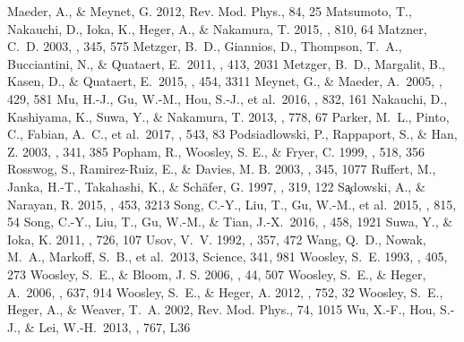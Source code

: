 \documentclass[twocolumn]{aastex6}
\begin{document}
\begin{thebibliography}{}
 Maeder, A., \& Meynet, G. 2012, Rev. Mod. Phys., 84, 25
 Matsumoto, T., Nakauchi, D., Ioka, K., Heger, A., \& Nakamura, T. 2015, \apj, 810, 64
 Matzner, C.~D. 2003, \mnras, 345, 575
 Metzger, B.~D., Giannios, D., Thompson, T.~A., Bucciantini, N., \& Quataert, E.\ 2011, \mnras, 413, 2031
 Metzger, B.~D., Margalit, B., Kasen, D., \& Quataert, E.\ 2015, \mnras, 454, 3311
 Meynet, G., \& Maeder, A.\ 2005, \aap, 429, 581
 Mu, H.-J., Gu, W.-M., Hou, S.-J., et al.\ 2016, \apj, 832, 161
 Nakauchi, D., Kashiyama, K., Suwa, Y., \& Nakamura, T. 2013, \apj, 778, 67
 Parker, M.~L., Pinto, C., Fabian, A.~C., et al.\ 2017, \nat, 543, 83
 Podsiadlowski, P., Rappaport, S., \& Han, Z. 2003, \mnras, 341, 385
 Popham, R., Woosley, S. E., \& Fryer, C. 1999, \apj, 518, 356
 Rosswog, S., Ramirez-Ruiz, E., \& Davies, M. B. 2003, \mnras, 345, 1077
 Ruffert, M., Janka, H.-T., Takahashi, K., \& Sch\"{a}fer, G. 1997, \aap, 319, 122
 S{\c a}dowski, A., \& Narayan, R. 2015, \mnras, 453, 3213
 Song, C.-Y., Liu, T., Gu, W.-M., et al.\ 2015, \apj, 815, 54
 Song, C.-Y., Liu, T., Gu, W.-M., \& Tian, J.-X.\ 2016, \mnras, 458, 1921
 Suwa, Y., \& Ioka, K. 2011, \apj, 726, 107
 Usov, V.~V. 1992, \nat, 357, 472
 Wang, Q.~D., Nowak, M.~A., Markoff, S.~B., et al.\ 2013, Science, 341, 981
 Woosley, S.~E. 1993, \apj, 405, 273
 Woosley, S.~E., \& Bloom, J. S. 2006, \araa, 44, 507
 Woosley, S.~E., \& Heger, A.\ 2006, \apj, 637, 914
 Woosley, S.~E., \& Heger, A. 2012, \apj, 752, 32
 Woosley, S.~E., Heger, A., \& Weaver, T.~A. 2002, Rev. Mod. Phys., 74, 1015
 Wu, X.-F., Hou, S.-J., \& Lei, W.-H.\ 2013, \apjl, 767, L36

\end{thebibliography}
\end{document}
